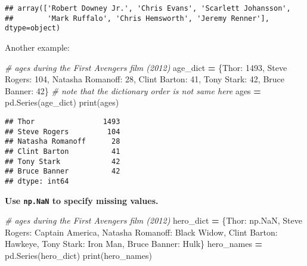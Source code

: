 \documentclass[
]{book}
\newenvironment{Shaded}{\begin{snugshade}}{\end{snugshade}}
\newcommand{\BuiltInTok}[1]{#1}
\newcommand{\CommentTok}[1]{\textcolor[rgb]{0.56,0.35,0.01}{\textit{#1}}}
\newcommand{\DecValTok}[1]{\textcolor[rgb]{0.00,0.00,0.81}{#1}}
\newcommand{\NormalTok}[1]{#1}
\newcommand{\OperatorTok}[1]{\textcolor[rgb]{0.81,0.36,0.00}{\textbf{#1}}}
\newcommand{\StringTok}[1]{\textcolor[rgb]{0.31,0.60,0.02}{#1}}
\begin{document}
\begin{verbatim}
## array(['Robert Downey Jr.', 'Chris Evans', 'Scarlett Johansson',
##        'Mark Ruffalo', 'Chris Hemsworth', 'Jeremy Renner'], dtype=object)
\end{verbatim}

Another example:

\begin{Shaded}
\begin{Highlighting}[]
\CommentTok{\# ages during the First Avengers film (2012)}
\NormalTok{age\_dict }\OperatorTok{=}\NormalTok{ \{}\StringTok{\textquotesingle{}Thor\textquotesingle{}}\NormalTok{: }\DecValTok{1493}\NormalTok{,}
            \StringTok{\textquotesingle{}Steve Rogers\textquotesingle{}}\NormalTok{: }\DecValTok{104}\NormalTok{,}
            \StringTok{\textquotesingle{}Natasha Romanoff\textquotesingle{}}\NormalTok{: }\DecValTok{28}\NormalTok{,}
            \StringTok{\textquotesingle{}Clint Barton\textquotesingle{}}\NormalTok{: }\DecValTok{41}\NormalTok{,}
            \StringTok{\textquotesingle{}Tony Stark\textquotesingle{}}\NormalTok{: }\DecValTok{42}\NormalTok{,}
            \StringTok{\textquotesingle{}Bruce Banner\textquotesingle{}}\NormalTok{: }\DecValTok{42}\NormalTok{\} }\CommentTok{\# note that the dictionary order is not same here}
\NormalTok{ages }\OperatorTok{=}\NormalTok{ pd.Series(age\_dict)}
\BuiltInTok{print}\NormalTok{(ages)}
\end{Highlighting}
\end{Shaded}

\begin{verbatim}
## Thor                1493
## Steve Rogers         104
## Natasha Romanoff      28
## Clint Barton          41
## Tony Stark            42
## Bruce Banner          42
## dtype: int64
\end{verbatim}

\textbf{Use \texttt{np.NaN} to specify missing values.}

\begin{Shaded}
\begin{Highlighting}[]
\CommentTok{\# ages during the First Avengers film (2012)}
\NormalTok{hero\_dict }\OperatorTok{=}\NormalTok{ \{}\StringTok{\textquotesingle{}Thor\textquotesingle{}}\NormalTok{: np.NaN,}
             \StringTok{\textquotesingle{}Steve Rogers\textquotesingle{}}\NormalTok{: }\StringTok{\textquotesingle{}Captain America\textquotesingle{}}\NormalTok{,}
             \StringTok{\textquotesingle{}Natasha Romanoff\textquotesingle{}}\NormalTok{: }\StringTok{\textquotesingle{}Black Widow\textquotesingle{}}\NormalTok{,}
             \StringTok{\textquotesingle{}Clint Barton\textquotesingle{}}\NormalTok{: }\StringTok{\textquotesingle{}Hawkeye\textquotesingle{}}\NormalTok{,}
             \StringTok{\textquotesingle{}Tony Stark\textquotesingle{}}\NormalTok{: }\StringTok{\textquotesingle{}Iron Man\textquotesingle{}}\NormalTok{,}
             \StringTok{\textquotesingle{}Bruce Banner\textquotesingle{}}\NormalTok{: }\StringTok{\textquotesingle{}Hulk\textquotesingle{}}\NormalTok{\}}
\NormalTok{hero\_names }\OperatorTok{=}\NormalTok{ pd.Series(hero\_dict)}
\BuiltInTok{print}\NormalTok{(hero\_names)}
\end{Highlighting}
\end{Shaded}
\end{document}
